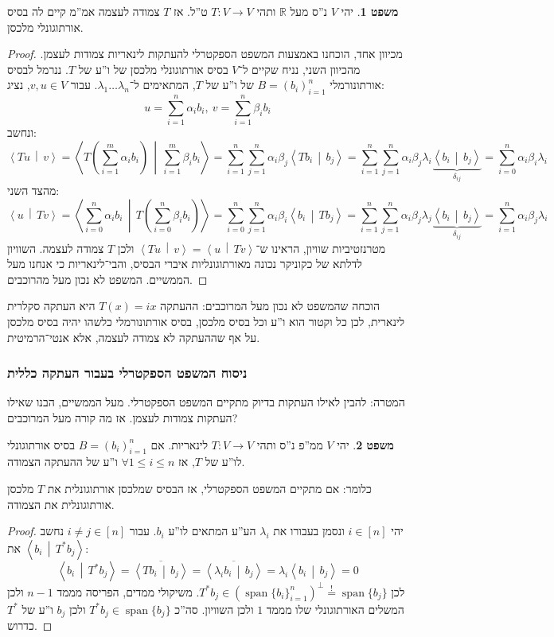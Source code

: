 \documentclass[a4paper]{article}
\newcommand\R     {\mathbb{R}}
\newcommand\ra    {\rangle}
\newcommand\la    {\langle}
\newcommand\seq   {\overset{!}{=}}
\newcommand\ol    {\overline}
\newcommand\sumni     {\sum_{i = 0}^{n}}
\DeclareMathOperator{\Sp}      {span}
\newcommand\co        {\colon}
\newcommand\mut [2]   {\left \la #1 \,\middle|\, #2 \right \ra}
\newcommand\ag        {\alpha}
\newcommand\bg        {\beta}
\newcommand\dg        {\delta}
\renewcommand\lg      {\lambda}
\newcommand\cl [1]    {\left ( #1 \right )}
\theoremstyle{definition}
\newtheorem{Theorem}{\color{myblue}משפט}
\newcommand\theo  [1] {\begin{Theorem}#1\end{Theorem}}
\begin{document}
	\theo{יהי $V$ נ''ס מעל $\R$ ותהי $T \co V \to V$ ט''ל. אז $T$ צמודה לעצמה אמ''מ קיים לה בסיס אורתוגונלי מלכסן. }\begin{proof}
		מכיוון אחד, הוכחנו באמצעות המשפט הספקטרלי להעתקות לינאריות צמודות לעצמן. 
		מהכיוון השני, נניח שקיים ל־$V$ בסיס אורתוגונלי מלכסן של ו''ע של $T$. ננרמל לבסיס אורתונורמלי $B = (b_i)_{i = 1}^{n}$ של ו''ע של $T$, המתאימים ל־$\lg_1 \dots \lg_n$. עבור $v, u \in V$, נציג: 
		\[ u = \sum_{i = 1}^{n}\ag_i b_i, \ v = \sum_{i = 1}^{n}\bg_i b_i \]
		ונחשב: 
		\[ \mut{Tu}{v} = \mut{T\cl{\sum_{i = 1}^{m}\ag_i b_i}}{\sum_{i = 1}^{m}\bg_i b_i} = \sum_{i = 1}^{n}\sum_{j = 1}^{n}\ag_i \bg_j \mut{T b_i}{b_j} = \sum_{i = 1}^{n}\sum_{j = 1}^{n}\ag_i \bg_j \lg_i \underbrace{\mut{b_i}{b_j}}_{\dg_{ij}} = \sumni \ag_i \bg_i \lg_i \]
		מהצד השני: 
		\[ \mut{u}{Tv} = \mut{\sumni \ag_i b_i}{T\cl{\sumni \bg_i b_i}} = \sumni \sum_{j = 1}^{n}\ag_i \bg_i \mut{b_i}{Tb_j} = \sum_{i = 1}^{n}\sum_{j = 1}^{n}\ag_i \bg_j \lg_j \underbrace{\mut{b_i}{b_j}}_{\dg_{ij}} = \sum_{i = 1}^{n}\ag_i \bg_j \lg_i \]
		מטרנזטיביות שוויון, הראינו ש־$\mut{Tu}{v} = \mut{u}{Tv}$ ולכן $T$ צמודה לעצמה. השוויון לדלתא של כקוניקר נכונה מאורתוגונליות איברי הבסיס, והבי־לינאריות כי אנחנו מעל הממשיים. המשפט לא נכון מעל מהרוכבים. 
	\end{proof}
	הוכחה שהמשפט לא נכון מעל המרוכבים: ההעתקה $T(x) = ix$ היא העתקה סקלרית לינארית, לכן כל וקטור הוא ו''ע וכל בסיס מלכסן, בסיס אורתונורמלי כלשהו יהיה בסיס מלכסן על אף שההעתקה לא צמודה לעצמה, אלא אנטי־הרמיטית. 
	
	
	\subsubsection{ניסוח המשפט הספקטרלי בעבור העתקה כללית}
	
	המטרה: להבין לאילו העתקות בדיוק מתקיים המשפט הספקטרלי. מעל הממשיים, הבנו שאילו העתקות צמודות לעצמן. אז מה קורה מעל המרוכבים? 
	
	\theo{יהי $V$ ממ''פ נ''ס ותהי $T \co V \to V$ לינאריות. אם $B = (b_i)_{i = 1}^{n}$ בסיס אורתוגונלי לו''ע של $T$, אז $\forall 1 \le i \le n$ ו''ע של ההעתקה הצמודה. }
	כלומר: אם מתקיים המשפט הספקטרלי, אז הבסיס שמלכסן אורתוגונלית את $T$ מלכסן אורתוגונלית את הצמודה. 
	\begin{proof}
		יהי $i \in [n]$ ונסמן בעבורו את $\lg_i$ הע''ע המתאים לו''ע $b_i$. עבור $i \neq j \in [n]$ נחשב את $\mut{b_i}{T^*b_j}$: 
		\[ \mut{b_i}{T^*b_j} = \ol{\mut{Tb_i}{b_j}} = \ol{\mut{\lg _i b_i}{b_j}} = \lg_i \mut{b_i}{b_j} = 0 \]
		לכן $T^*b_j \in (\Sp\{b_i\}_{i = 1}^{n})^{\perp} \seq \Sp\{b_j\}$. משיקולי ממדים, הפריסה מממד $n - 1$ ולכן המשלים האורתוגונלי שלו מממד $1$ ולכן השוויון. סה''כ $T^* b_j \in \Sp\{b_j\}$ ולכן $b_j$ ו''ע של $T^*$ כדרוש. 
	\end{proof}
	
\end{document}
